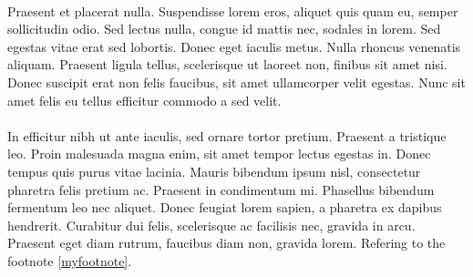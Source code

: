 \documentclass[a4paper]{article}
\begin{document}
\paragraph{}
Praesent et placerat nulla. Suspendisse lorem eros, aliquet quis quam eu, semper sollicitudin odio. Sed lectus nulla, congue id mattis nec, sodales in lorem. Sed egestas vitae erat sed lobortis. Donec eget iaculis metus. Nulla rhoncus venenatis aliquam. Praesent ligula tellus, scelerisque ut laoreet non, finibus sit amet nisi. Donec suscipit erat non felis faucibus, sit amet ullamcorper velit egestas. Nunc sit amet felis eu tellus efficitur commodo a sed velit.

\paragraph{}
In efficitur nibh ut ante iaculis, sed ornare tortor pretium. Praesent a tristique leo. Proin malesuada magna enim, sit amet tempor lectus egestas in. Donec tempus quis purus vitae lacinia. Mauris bibendum ipsum nisl, consectetur pharetra felis pretium ac. Praesent in condimentum mi. Phasellus bibendum fermentum leo nec aliquet. Donec feugiat lorem sapien, a pharetra ex dapibus hendrerit. Curabitur dui felis, scelerisque ac facilisis nec, gravida in arcu. Praesent eget diam rutrum, faucibus diam non, gravida lorem.
Refering to the footnote \ref{myfootnote}.
\end{document}
